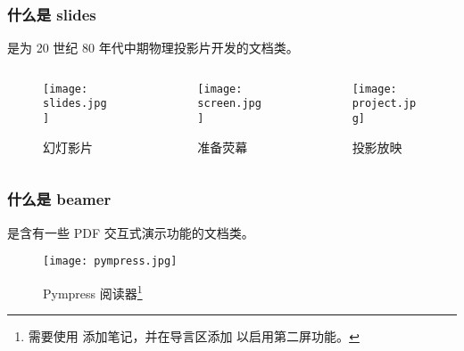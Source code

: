 \begin{frame}
  \frametitle{什么是 slides}

   是为 20 世纪 80 年代中期物理投影片开发的文档类。

  \begin{columns}
    \begin{column}{0.33\textwidth}
      \begin{figure}
        \centering
        \begin{stampbox}[sjtuRedPrimary]
          \scriptsize
          \texttt{[image: slides.jpg]}
        \end{stampbox}
        \caption{幻灯影片}
      \end{figure}
    \end{column}
    \begin{column}{0.33\textwidth}
      \begin{figure}
        \centering
        \begin{stampbox}[sjtuRedPrimary]
          \scriptsize
          \texttt{[image: screen.jpg]}
        \end{stampbox}
        \caption{准备荧幕}
      \end{figure}
    \end{column}
    \begin{column}{0.33\textwidth}
      \begin{figure}
        \centering
        \begin{stampbox}[sjtuRedPrimary]
          \scriptsize
          \texttt{[image: project.jpg]}
        \end{stampbox}
        \caption{投影放映}
      \end{figure}
    \end{column}
  \end{columns}
\end{frame}

\begin{frame}
  \frametitle{什么是 beamer}

   是含有一些 PDF 交互式演示功能的文档类。

  \begin{figure}
    \centering
    \texttt{[image: pympress.jpg]}
    \caption{Pympress 阅读器\footnote{需要使用  添加笔记，并在导言区添加  以启用第二屏功能。} }
  \end{figure}

\end{frame}

